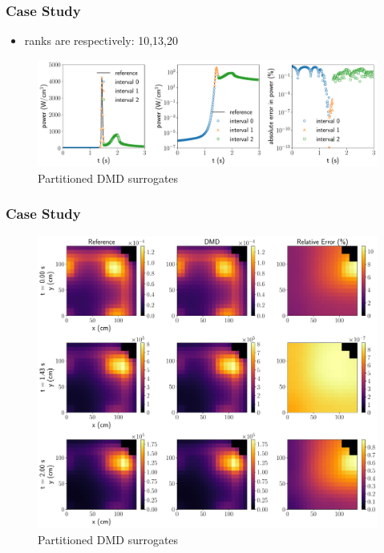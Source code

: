\documentclass[fleqn]{beamer}
\begin{document}

\begin{frame}
\frametitle{Case Study}
\begin{itemize}
 \item ranks are respectively: 10,13,20
\end{itemize}

\begin{figure}[ht]
\includegraphics[scale=0.3]{corepower.pdf}
\caption{Partitioned DMD surrogates}
\end{figure}
\end{frame}

\begin{frame}
\frametitle{Case Study}
\begin{figure}[ht]
\includegraphics[scale=0.18]{meshpower.pdf}
\caption{Partitioned DMD surrogates}
\end{figure}
\end{frame}
\end{document}
